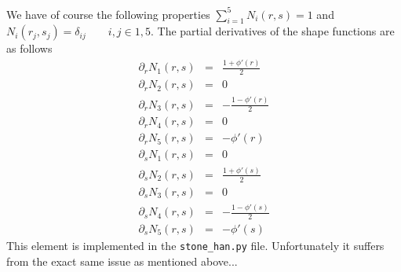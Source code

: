We have of course the following properties $\sum_{i=1}^5 N_i(r,s) = 1$ and 
$N_i(r_j,s_j) = \delta_{ij}  \qquad i,j \in 1,5$. The partial derivatives of the shape functions are as follows
\begin{eqnarray}
\partial_r N_1(r,s) &=& \frac{1 + \phi'(r)}{2} \\
\partial_r N_2(r,s) &=& 0 \\
\partial_r N_3(r,s) &=& -\frac{1-\phi'(r)}{2} \\
\partial_r N_4(r,s) &=& 0 \\
\partial_r N_5(r,s) &=& -\phi'(r) \\
\partial_s N_1(r,s) &=& 0 \\
\partial_s N_2(r,s) &=& \frac{1 + \phi'(s)}{2} \\
\partial_s N_3(r,s) &=&  0 \\
\partial_s N_4(r,s) &=& -\frac{1-\phi'(s)}{2} \\
\partial_s N_5(r,s) &=& -\phi'(s)
\end{eqnarray}
This element is implemented in the {\tt stone\_han.py} file. 
Unfortunately it suffers from the exact same issue as mentioned above...






